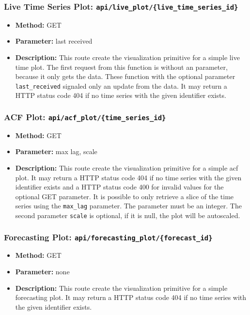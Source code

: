 \documentclass[11pt, a4paper]{article}
\begin{document}
\subsubsection*{Live Time Series Plot: \texttt{api/live\_plot/\{live\_time\_series\_id\}}}
\begin{itemize}
 \item[] \textbf{Method:} GET 
 \item[] \textbf{Parameter:} last received
 \item[] \textbf{Description:} This route create the visualization primitive for a simple live time plot.
 The first request from this function is without an parameter, because it only gets the data. These function with the optional 
 parameter \texttt{last\_received} signaled only an update from the data.
 It may return a HTTP status code 404 if no time series with the given identifier exists.
\end{itemize}


\subsubsection*{ACF Plot: \texttt{api/acf\_plot/\{time\_series\_id\}}}
\begin{itemize}
 \item[] \textbf{Method:} GET 
 \item[] \textbf{Parameter:} max lag, scale
 \item[] \textbf{Description:} This route create the visualization primitive for a simple acf plot.
 It may return a HTTP status code 404 if no time series with the given identifier exists and a HTTP status code 400 for invalid values for the optional GET parameter.
 It is possible to only retrieve a slice of the time series using the \texttt{max\_lag} parameter. The parameter must be an integer.
 The second parameter \texttt{scale} is optional, if it is null, the plot will be autoscaled.
\end{itemize}


\subsubsection*{Forecasting Plot: \texttt{api/forecasting\_plot/\{forecast\_id\}}}
\begin{itemize}
 \item[] \textbf{Method:} GET 
 \item[] \textbf{Parameter:} none
 \item[] \textbf{Description:} This route create the visualization primitive for a simple forecasting plot.
 It may return a HTTP status code 404 if no time series with the given identifier exists.
\end{itemize}
\end{document}
